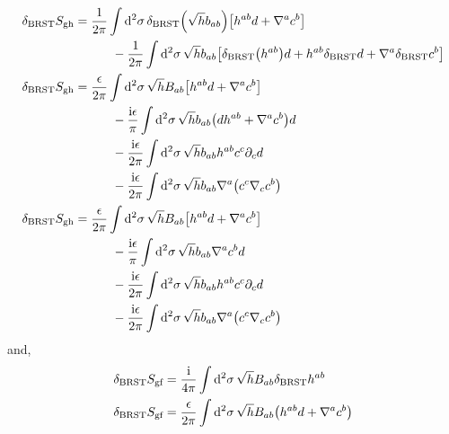 \begin{align*}
    \delta_{\textnormal{BRST}}S_{\textnormal{gh}}&=\frac{1}{2\pi}\int\dd[2]{\sigma}\delta_{\textnormal{BRST}}\qty(\sqrt{h}b_{ab})\qty[h^{ab}d+\nabla^ac^b]\\
    &\quad\quad\quad-\frac{1}{2\pi}\int\dd[2]{\sigma}\sqrt{h}b_{ab}\qty[\delta_{\textnormal{BRST}}\qty(h^{ab})d+h^{ab}\delta_{\textnormal{BRST}}d+\nabla^a\delta_{\textnormal{BRST}}c^b]\\
    \delta_{\textnormal{BRST}}S_{\textnormal{gh}}&=\frac{\epsilon}{2\pi}\int\dd[2]{\sigma}\sqrt{h}B_{ab}\qty[h^{ab}d+\nabla^ac^b]\\
    &\quad\quad\quad-\frac{\textnormal{i}\epsilon}{\pi}\int\dd[2]{\sigma}\sqrt{h}b_{ab}\qty(dh^{ab}+\nabla^ac ^b)d\\
    &\quad\quad\quad-\frac{\textnormal{i}\epsilon}{2\pi}\int\dd[2]{\sigma}\sqrt{h}b_{ab}h^{ab}c^c\partial_cd\\
    &\quad\quad\quad-\frac{\textnormal{i}\epsilon}{2\pi}\int\dd[2]{\sigma}\sqrt{h}b_{ab}\nabla^a\qty(c ^c\nabla_ cc^b)\\
    \delta_{\textnormal{BRST}}S_{\textnormal{gh}}&=\frac{\epsilon}{2\pi}\int\dd[2]{\sigma}\sqrt{h}B_{ab}\qty[h^{ab}d+\nabla^ac^b]\\
    &\quad\quad\quad-\frac{\textnormal{i}\epsilon}{\pi}\int\dd[2]{\sigma}\sqrt{h}b_{ab}\nabla^ac ^bd\\
    &\quad\quad\quad-\frac{\textnormal{i}\epsilon}{2\pi}\int\dd[2]{\sigma}\sqrt{h}b_{ab}h^{ab}c^c\partial_cd\\
    &\quad\quad\quad-\frac{\textnormal{i}\epsilon}{2\pi}\int\dd[2]{\sigma}\sqrt{h}b_{ab}\nabla^a\qty(c ^c\nabla_ cc^b)
\end{align*}
and,
\begin{align*}
    \delta_{\textnormal{BRST}}S_{\textnormal{gf}}&=\frac{\textnormal{i}}{4\pi}\int\dd[2]{\sigma}\sqrt{h}B_{ab}\delta_{\textnormal{BRST}}h^{ab}\\
    \delta_{\textnormal{BRST}}S_{\textnormal{gf}}&=\frac{\epsilon}{2\pi}\int\dd[2]{\sigma}\sqrt{h}B_{ab}\qty(h^{ab}d+\nabla^ac ^b)
\end{align*}